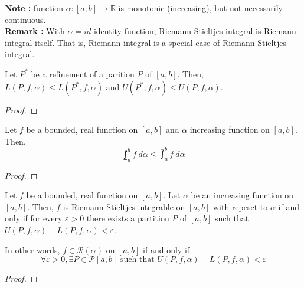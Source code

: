 \textbf{Note : } function $\alpha : [a,b] \to \mathbb{R}$ is monotonic (increasing), but not necessarily continuous.\\

\textbf{Remark : } With $\alpha = id$ identity function, Riemann-Stieltjes integral is Riemann integral itself.
	That is, Riemann integral is a special case of Riemann-Stieltjes integral.

\begin{theorem}
	Let $P^\ast$ be a refinement of a parition $P$ of $[a,b]$.
	Then, $L(P,f,\alpha) \le L(P^\ast,f,\alpha)$ and $U(P^\ast,f,\alpha) \le U(P,f,\alpha)$.
\end{theorem}
\begin{proof}
\end{proof}

\begin{theorem}
	Let $f$ be a bounded, real function on $[a,b]$ and $\alpha$ increasing function on $[a,b]$.
	Then,
	\[ \lowint_a^b f\ d\alpha \le \upint_a^b f\ d\alpha \]
\end{theorem}
\begin{proof}
\end{proof}

\begin{theorem}
	Let $f$ be  a bounded, real function on $[a,b]$.
	Let $\alpha$ be an increasing function on $[a,b]$.
	Then, $f$ is Riemann-Stieltjes integrable on $[a,b]$ with repesct to $\alpha$ if and only if for every $\varepsilon > 0$ there exists a partition $P$ of $[a,b]$ such that $U(P,f,\alpha) - L(P,f,\alpha) < \varepsilon$.
\end{theorem}
\begin{commentary}
	In other words, $f \in \mathscr{R}(\alpha)$ on $[a,b]$ if and only if 
	\[ \forall \varepsilon > 0, \exists P \in \mathscr{P}[a,b] \text{ such that }U(P,f,\alpha) - L(P,f,\alpha) < \varepsilon \]
\end{commentary}
\begin{proof}
\end{proof}

